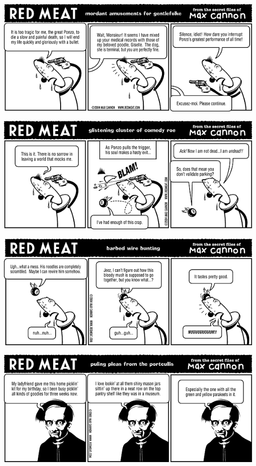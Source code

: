 \documentclass[a4paper,twoside,11pt]{article}
\begin{document}
\includegraphics[width=\textwidth]{redmeat_2004-12-21.png}



\includegraphics[width=\textwidth]{redmeat_2004-12-28.png}



\includegraphics[width=\textwidth]{redmeat_2005-01-04.png}



\includegraphics[width=\textwidth]{redmeat_2005-01-11.png}
\end{document}
